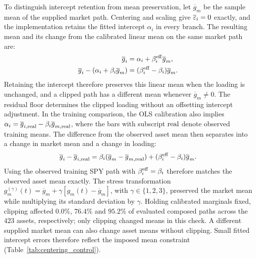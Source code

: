 To distinguish intercept retention from mean preservation, let
$\overline{g}_m$ be the sample mean of the supplied market path.
Centering and scaling give $\overline{\varepsilon}_i=0$ exactly, and the
implementation retains the fitted intercept $\alpha_i$ in every
branch. The resulting mean and its change from the calibrated linear
mean on the same market path are:
\begin{align}
  \overline{g}_i
    &= \alpha_i+\beta_i^{\mathrm{eff}}\overline{g}_m, \notag\\
  \overline{g}_i-(\alpha_i+\beta_i\overline{g}_m)
    &= (\beta_i^{\mathrm{eff}}-\beta_i)\overline{g}_m.
  \label{eq:supp-clipped-mean}
\end{align}
Retaining the intercept therefore preserves this linear mean when the
loading is unchanged, and a clipped path has a different mean whenever
$\overline{g}_m\ne0$. The residual floor determines the clipped loading without an offsetting intercept adjustment. In the training comparison, the OLS
calibration also implies
$\alpha_i=\overline{g}_{i,\mathrm{real}}-\beta_i\overline{g}_{m,\mathrm{real}}$,
where the bars with subscript $\mathrm{real}$ denote observed training means.
The difference from the observed asset mean then separates into a
change in market mean and a change in loading:
\begin{equation}
  \overline{g}_i-\overline{g}_{i,\mathrm{real}}
  = \beta_i(\overline{g}_m-\overline{g}_{m,\mathrm{real}})
    +(\beta_i^{\mathrm{eff}}-\beta_i)\overline{g}_m.
  \label{eq:supp-training-mean-shift}
\end{equation}
Using the observed training SPY path with $\beta_i^{\mathrm{eff}}=\beta_i$
therefore matches the observed asset mean exactly. The stress transformation $g_m^{(\gamma)}(t)=\overline{g}_m+\gamma[g_m(t)-\overline{g}_m]$, with $\gamma\in\{1,2,3\}$, preserved the market mean while multiplying its standard deviation by $\gamma$. Holding calibrated marginals fixed, clipping affected $0.0\%$, $76.4\%$ and $95.2\%$ of evaluated composed paths across the $423$ assets, respectively; only clipping changed means in this check. A different supplied market mean can also change asset means without clipping. Small fitted intercept errors therefore reflect the imposed mean constraint (Table~\ref{tab:centering_control}).

